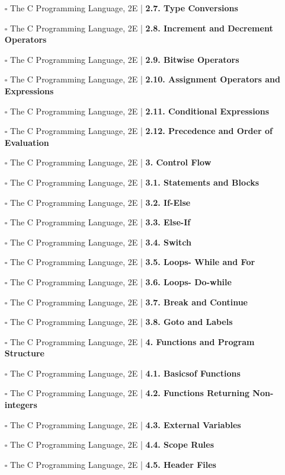 \documentclass[a4, landscape, 12pt]{article}
\newcommand{\checkbox}{$\square$}%
\begin{document}
\begin{itemize}
{}
\item [\checkbox]  The C Programming Language, 2E | \textbf{ 2.7. Type Conversions
}
\item [\checkbox]  The C Programming Language, 2E | \textbf{ 2.8. Increment and Decrement Operators
}
\item [\checkbox]  The C Programming Language, 2E | \textbf{ 2.9. Bitwise Operators
}
\item [\checkbox]  The C Programming Language, 2E | \textbf{ 2.10. Assignment Operators and Expressions
}
\item [\checkbox]  The C Programming Language, 2E | \textbf{ 2.11. Conditional Expressions
}
\item [\checkbox]  The C Programming Language, 2E | \textbf{ 2.12. Precedence and Order of Evaluation
}
\item [\checkbox]  The C Programming Language, 2E | \textbf{ 3. Control Flow
}
\item [\checkbox]  The C Programming Language, 2E | \textbf{ 3.1. Statements and Blocks
}
\item [\checkbox]  The C Programming Language, 2E | \textbf{ 3.2. If-Else
}
\item [\checkbox]  The C Programming Language, 2E | \textbf{ 3.3. Else-If
}
\item [\checkbox]  The C Programming Language, 2E | \textbf{ 3.4. Switch
}
\item [\checkbox]  The C Programming Language, 2E | \textbf{ 3.5. Loops- While and For
}
\item [\checkbox]  The C Programming Language, 2E | \textbf{ 3.6. Loops- Do-while
}
\item [\checkbox]  The C Programming Language, 2E | \textbf{ 3.7. Break and Continue
}
\item [\checkbox]  The C Programming Language, 2E | \textbf{ 3.8. Goto and Labels
}
\item [\checkbox]  The C Programming Language, 2E | \textbf{ 4. Functions and Program Structure
}
\item [\checkbox]  The C Programming Language, 2E | \textbf{ 4.1. Basicsof Functions
}
\item [\checkbox]  The C Programming Language, 2E | \textbf{ 4.2. Functions Returning Non-integers
}
\item [\checkbox]  The C Programming Language, 2E | \textbf{ 4.3. External Variables
}
\item [\checkbox]  The C Programming Language, 2E | \textbf{ 4.4. Scope Rules
}
\item [\checkbox]  The C Programming Language, 2E | \textbf{ 4.5. Header Files
}
\end{itemize}
\end{document}
